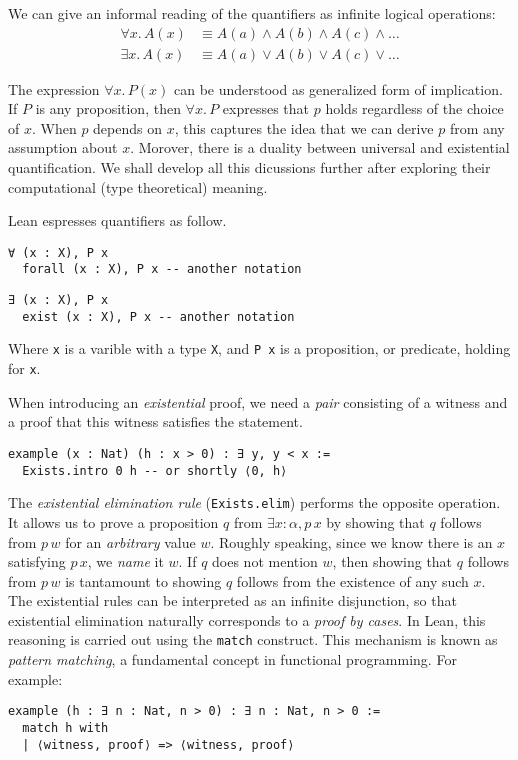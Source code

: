 We can give an informal reading of the quantifiers as infinite logical operations:
\begin{align*}
\forall x.\,A(x) &\equiv A(a) \land A(b) \land A(c) \land \ldots \\
\exists x.\,A(x) &\equiv A(a) \lor A(b) \lor A(c) \lor \ldots
\end{align*}

The expression $\forall x.\, P(x)$ can be understood as  generalized form of implication. 
If $P$ is any proposition, then $\forall x.\, P$ expresses that $p$ holds 
regardless of the choice of $x$. When $p$ depends on $x$, this captures the 
idea that we can derive $p$ from any assumption about $x$.
Morover, there is a duality between universal and existential quantification.
We shall develop all this dicussions further after 
exploring their computational (type theoretical) meaning.

\begin{example}
  Lean espresses quantifiers as follow.
  \begin{lstlisting}[language=Lean, caption=For All]
  ∀ (x : X), P x
  forall (x : X), P x -- another notation
  \end{lstlisting}

  \begin{lstlisting}[language=Lean, caption=Exists]
  ∃ (x : X), P x
  exist (x : X), P x -- another notation
  \end{lstlisting}
  Where \lstinline[language=lean]|x| is a varible with a type \lstinline[language=lean]|X|,
  and \lstinline[language=lean]|P x| is a proposition, or predicate, holding for \lstinline[language=lean]|x|.

\end{example}

When introducing an \emph{existential} proof, 
we need a \emph{pair} consisting 
of a witness and a proof that this witness 
satisfies the statement.

\begin{lstlisting}[language=lean]
example (x : Nat) (h : x > 0) : ∃ y, y < x :=
  Exists.intro 0 h -- or shortly ⟨0, h⟩
\end{lstlisting}
The \emph{existential elimination rule} 
(\texttt{Exists.elim}) performs the opposite operation. 
It allows us to prove a proposition \(q\) 
from \(\exists x : \alpha, p\,x\) by showing 
that \(q\) follows from \(p\,w\) for an \emph{arbitrary} 
value \(w\).
Roughly speaking, since we know there is an \(x\) 
satisfying \(p\,x\), we \emph{name} it \(w\). 
If \(q\) does not mention \(w\), then showing that \(q\) 
follows from \(p\,w\) is tantamount to showing \(q\) 
follows from the existence of any such \(x\).
The existential rules can be interpreted as an infinite 
disjunction, 
so that existential elimination naturally corresponds to a \emph{proof by cases}. 
In Lean, this reasoning is carried out using the 
\lstinline[language=lean]|match| construct. 
This mechanism is known as \emph{pattern matching}, 
a fundamental concept in functional programming. 
For example:
\begin{lstlisting}[language=lean]
example (h : ∃ n : Nat, n > 0) : ∃ n : Nat, n > 0 :=
  match h with
  | ⟨witness, proof⟩ => ⟨witness, proof⟩
\end{lstlisting}

